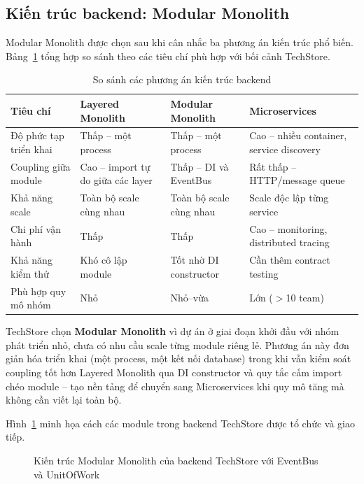 \subsection{Kiến trúc backend: Modular Monolith}

Modular Monolith được chọn sau khi cân nhắc ba phương án kiến trúc phổ biến. Bảng~\ref{tab:arch_comparison} tổng hợp so sánh theo các tiêu chí phù hợp với bối cảnh TechStore.

\begin{table}[H]
  \centering
  \caption{So sánh các phương án kiến trúc backend}
  \label{tab:arch_comparison}
  {\footnotesize
  \begin{tabular}{|p{2.8cm}|p{3.3cm}|p{3.3cm}|p{3.3cm}|}
    \hline
    \textbf{Tiêu chí} & \textbf{Layered Monolith} & \textbf{Modular Monolith} & \textbf{Microservices} \\
    \hline
    Độ phức tạp triển khai & Thấp -- một process & Thấp -- một process & Cao -- nhiều container, service discovery \\
    \hline
    Coupling giữa module & Cao -- import tự do giữa các layer & Thấp -- DI và EventBus & Rất thấp -- HTTP\slash message queue \\
    \hline
    Khả năng scale & Toàn bộ scale cùng nhau & Toàn bộ scale cùng nhau & Scale độc lập từng service \\
    \hline
    Chi phí vận hành & Thấp & Thấp & Cao -- monitoring, distributed tracing \\
    \hline
    Khả năng kiểm thử & Khó cô lập module & Tốt nhờ DI constructor & Cần thêm contract testing \\
    \hline
    Phù hợp quy mô nhóm & Nhỏ & Nhỏ--vừa & Lớn ($>$10 team) \\
    \hline
  \end{tabular}
  }
\end{table}

TechStore chọn \textbf{Modular Monolith} vì dự án ở giai đoạn khởi đầu với nhóm phát triển nhỏ, chưa có nhu cầu scale từng module riêng lẻ. Phương án này đơn giản hóa triển khai (một process, một kết nối database) trong khi vẫn kiểm soát coupling tốt hơn Layered Monolith qua DI constructor và quy tắc cấm import chéo module -- tạo nền tảng để chuyển sang Microservices khi quy mô tăng mà không cần viết lại toàn bộ.

Hình~\ref{fig:modular_architecture} minh họa cách các module trong backend TechStore được tổ chức và giao tiếp.

\begin{figure}[H]
  \centering
  \caption{Kiến trúc Modular Monolith của backend TechStore với EventBus và UnitOfWork}
  \label{fig:modular_architecture}
\end{figure}

